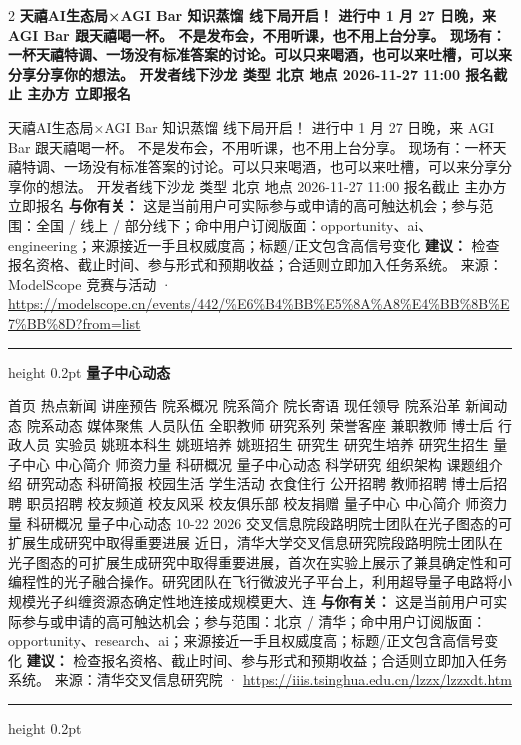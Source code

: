 \documentclass[10.5pt]{ctexart}
\begin{document}
\begin{multicols}{2}
{\large\bfseries 天禧AI生态局×AGI Bar 知识蒸馏 线下局开启！ 进行中 1 月 27 日晚，来 AGI Bar 跟天禧喝一杯。 不是发布会，不用听课，也不用上台分享。 现场有：一杯天禧特调、一场没有标准答案的讨论。可以只来喝酒，也可以来吐槽，可以来分享分享你的想法。 开发者线下沙龙 类型 北京 地点 2026-11-27 11:00 报名截止 主办方 立即报名}\par
天禧AI生态局×AGI Bar 知识蒸馏 线下局开启！ 进行中 1 月 27 日晚，来 AGI Bar 跟天禧喝一杯。 不是发布会，不用听课，也不用上台分享。 现场有：一杯天禧特调、一场没有标准答案的讨论。可以只来喝酒，也可以来吐槽，可以来分享分享你的想法。 开发者线下沙龙 类型 北京 地点 2026-11-27 11:00 报名截止 主办方 立即报名
\textbf{与你有关：} 这是当前用户可实际参与或申请的高可触达机会；参与范围：全国 / 线上 / 部分线下；命中用户订阅版面：opportunity、ai、engineering；来源接近一手且权威度高；标题/正文包含高信号变化
\textbf{建议：} 检查报名资格、截止时间、参与形式和预期收益；合适则立即加入任务系统。
{\footnotesize\color{ormuted} 来源：ModelScope 竞赛与活动 · \url{https://modelscope.cn/events/442/%E6%B4%BB%E5%8A%A8%E4%BB%8B%E7%BB%8D?from=list}}
\vspace{2mm}
\hrule height 0.2pt
\vspace{2mm}
{\large\bfseries 量子中心动态}\par
首页 热点新闻 讲座预告 院系概况 院系简介 院长寄语 现任领导 院系沿革 新闻动态 院系动态 媒体聚焦 人员队伍 全职教师 研究系列 荣誉客座 兼职教师 博士后 行政人员 实验员 姚班本科生 姚班培养 姚班招生 研究生 研究生培养 研究生招生 量子中心 中心简介 师资力量 科研概况 量子中心动态 科学研究 组织架构 课题组介绍 研究动态 科研简报 校园生活 学生活动 衣食住行 公开招聘 教师招聘 博士后招聘 职员招聘 校友频道 校友风采 校友俱乐部 校友捐赠 量子中心 中心简介 师资力量 科研概况 量子中心动态 10-22 2026 交叉信息院段路明院士团队在光子图态的可扩展生成研究中取得重要进展 近日，清华大学交叉信息研究院段路明院士团队在光子图态的可扩展生成研究中取得重要进展，首次在实验上展示了兼具确定性和可编程性的光子融合操作。研究团队在飞行微波光子平台上，利用超导量子电路将小规模光子纠缠资源态确定性地连接成规模更大、连
\textbf{与你有关：} 这是当前用户可实际参与或申请的高可触达机会；参与范围：北京 / 清华；命中用户订阅版面：opportunity、research、ai；来源接近一手且权威度高；标题/正文包含高信号变化
\textbf{建议：} 检查报名资格、截止时间、参与形式和预期收益；合适则立即加入任务系统。
{\footnotesize\color{ormuted} 来源：清华交叉信息研究院 · \url{https://iiis.tsinghua.edu.cn/lzzx/lzzxdt.htm}}
\vspace{2mm}
\hrule height 0.2pt
\vspace{2mm}

\end{multicols}
\end{document}
